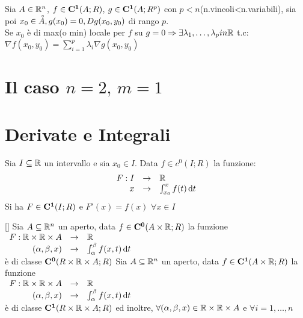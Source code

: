 Sia $A\in \mathbb{R}^n$, $f\in \mathbf{C^{1}}(A;R)$, $g\in \mathbf{C^{1}}(A;R^p)$ con $p<n$(n.vincoli<n.variabili), sia poi $x_0\in\accentset{\circ}{A}, g(x_0)=0, Dg (x_0,y_0)$ di rango $p$.\\
Se $x_0$ è di max(o min) locale per $f$ su $g=0\Rightarrow\exists \lambda_1,\ldots,\lambda_p in \mathbb{R}$ t.c: $\nabla f(x_0,y_0) = \sum\limits_{i=1}^{p}\lambda_i\nabla g(x_0,y_0)$\\
\section{Il caso \texorpdfstring{$n=2,\,m=1$}{n=2, m=1}}
\section{Derivate e Integrali}
\begin{proposition}
	\label{teo:fondament_calcolo_integ}
	Sia $I\subseteq \mathbb{R}$ un intervallo e sia $x_0\in I$. Data $f\in c^0(I;R)$ la funzione:
	$$\begin{array}{rcl} F: I & \to & \mathbb{R} \\ x & \to & \int_{x_0}^{x}f(t)\,\mathrm{d}{t} \end{array}$$
	Si ha $F\in \mathbf{C^{1}}(I;R)$ e $F'(x)=f(x)$ $\forall x \in I$
\end{proposition}[]
\proposition
Sia $A\subseteq \mathbb{R}^n$ un aperto, data $f\in \mathbf{C^{0}}(A\times \mathbb{R};R)$ la funzione \\
$\begin{array}{rcl} F: \mathbb{R}\times \mathbb{R}\times A & \to & \mathbb{R} \\ (\alpha,\beta,x) & \to & \int_{\alpha}^{\beta}f(x,t)\,\mathrm{d}{t} \end{array}$\\
è di classe $\mathbf{C^{0}}(R\times \mathbb{R}\times A;R)$
\proposition
Sia $A\subseteq \mathbb{R}^n$ un aperto, data $f\in \mathbf{C^{1}}(A\times \mathbb{R};R)$ la funzione \\
$\begin{array}{rcl} F: \mathbb{R}\times \mathbb{R}\times A & \to & \mathbb{R} \\ (\alpha,\beta,x) & \to & \int_{\alpha}^{\beta}f(x,t)\,\mathrm{d}{t} \end{array}$\\
è di classe $\mathbf{C^{1}}(R\times \mathbb{R}\times A;R)$ ed inoltre, $\forall (\alpha,\beta,x)\in \mathbb{R}\times \mathbb{R}\times A$ e $\forall i=1,\ldots,n$\\
